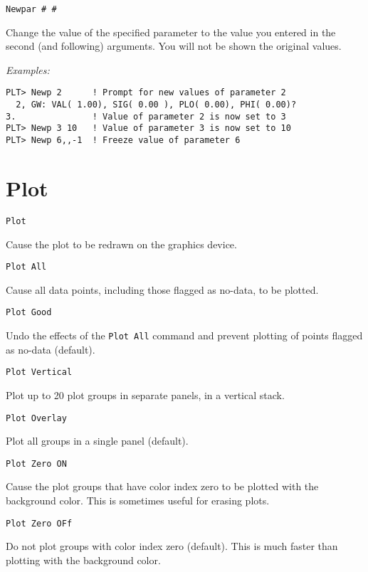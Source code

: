 \medskip
\begin{verbatim}
Newpar # #
\end{verbatim}
   Change the value of the specified parameter to the value you entered
in the second (and following) arguments.  You will not be shown the
original values.

\medskip\noindent
{\em Examples:}
\begin{verbatim}
PLT> Newp 2      ! Prompt for new values of parameter 2
  2, GW: VAL( 1.00), SIG( 0.00 ), PLO( 0.00), PHI( 0.00)?
3.               ! Value of parameter 2 is now set to 3
PLT> Newp 3 10   ! Value of parameter 3 is now set to 10
PLT> Newp 6,,-1  ! Freeze value of parameter 6
\end{verbatim}

\section*{Plot}
\begin{verbatim}
Plot
\end{verbatim}
   Cause the plot to be redrawn on the graphics device.

\medskip
\begin{verbatim}
Plot All
\end{verbatim}
   Cause all data points, including those flagged as no-data, to be
plotted.

\medskip
\begin{verbatim}
Plot Good
\end{verbatim}
   Undo the effects of the {\tt Plot~All} command and prevent plotting of
points flagged as no-data (default).

\medskip
\begin{verbatim}
Plot Vertical
\end{verbatim}
   Plot up to 20 plot groups in separate panels, in a vertical stack.

\medskip
\begin{verbatim}
Plot Overlay
\end{verbatim}
   Plot all groups in a single panel (default).

\medskip
\begin{verbatim}
Plot Zero ON
\end{verbatim}
   Cause the plot groups that have color index zero to be plotted
with the background color.  This is sometimes useful for erasing plots.

\medskip
\begin{verbatim}
Plot Zero OFf
\end{verbatim}
   Do not plot groups with color index zero (default).  This is much
faster than plotting with the background color.


